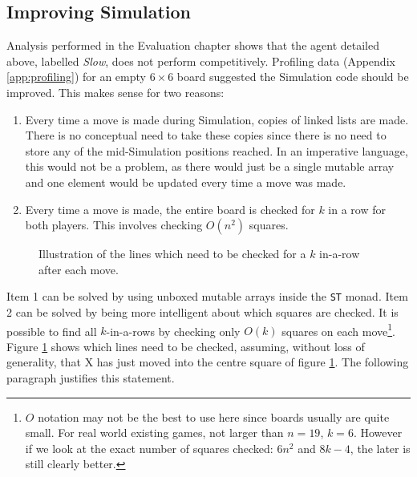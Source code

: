 \subsection{Improving Simulation\label{sec:informal_proof}}
Analysis performed in the Evaluation chapter shows that the agent detailed above, labelled \textit{Slow}, does not perform competitively. Profiling data (Appendix \ref{app:profiling}) for an empty $6 \times 6$ board suggested the Simulation code should be improved. This makes sense for two reasons:
\begin{enumerate}
\item Every time a move is made during Simulation, copies of linked lists are made. There is no conceptual need to take these copies since there is no need to store any of the mid-Simulation positions reached. In an imperative language, this would not be a problem, as there would just be a single mutable array and one element would be updated every time a move was made. 
\item Every time a move is made, the entire board is checked for $k$ in a row for both players. This involves checking $O(n^{2})$ squares. 
\end{enumerate}
\begin{figure}
\centering
\scalebox{0.7}{}
\caption{Illustration of the lines which need to be checked for a $k$ in-a-row after each move.\label{fig:connectkst}}
\end{figure}
Item 1 can be solved by using unboxed mutable arrays inside the \texttt{ST} {monad}. Item 2 can be solved by being more intelligent about which squares are checked.
It is possible to find all $k$-in-a-rows by checking only $O(k)$ squares on each move\footnote{$O$ notation may not be the best to use here since boards usually are quite small. For real world existing games, not larger than $n=19$, $k=6$. However if we look at the exact number of squares checked: $6n^{2}$ and $8k-4$, the later is still clearly better.}. Figure \ref{fig:connectkst} shows which lines need to be checked, assuming, without loss of generality, that {X} has just moved into the centre square of figure \ref{fig:connectkst}. The following paragraph justifies this statement.


